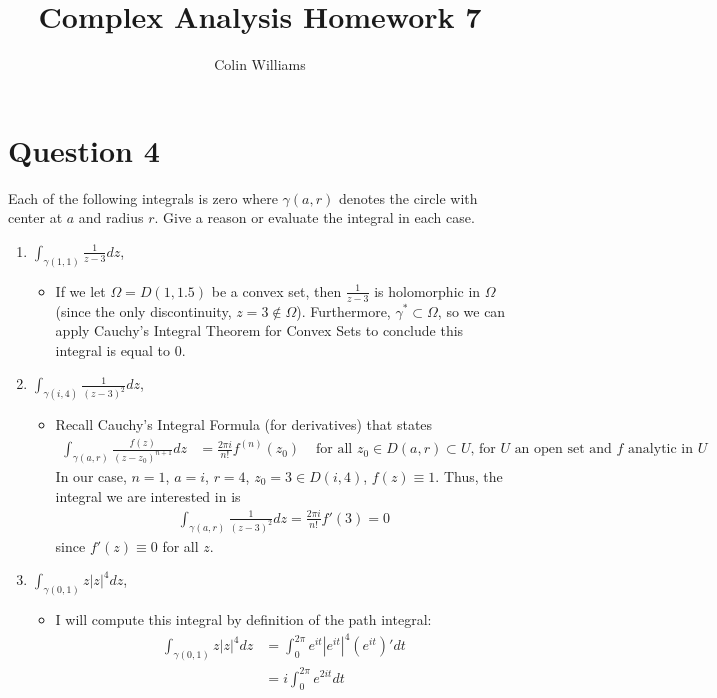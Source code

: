 \documentclass[10pt,a4paper]{article}
\title{Complex Analysis Homework 7}
\author{Colin Williams}
\theoremstyle{definition}
\begin{document}
\maketitle

\section*{Question 4}
Each of the following integrals is zero where $\gamma(a,r)$ denotes the circle with center at $a$ and radius $r$. Give a reason or evaluate the integral in each case. 
\begin{enumerate}[label = (\alph*)]
\item $\displaystyle \int_{\gamma(1,1)} \frac{1}{z - 3} dz$,
	\begin{itemize}
	\item If we let $\Omega = D(1,1.5)$ be a convex set, then $\frac{1}{z - 3}$ is holomorphic in $\Omega$ (since the only discontinuity, $z = 3 \not \in \Omega$). Furthermore, $\gamma^* \subset \Omega$, so we can apply Cauchy's Integral Theorem for Convex Sets to conclude this integral is equal to 0.
	\end{itemize}
\item $\displaystyle \int_{\gamma(i,4)} \frac{1}{(z - 3)^2} dz$,
	\begin{itemize}
	\item Recall Cauchy's Integral Formula (for derivatives) that states
	\begin{align*}
	\int_{\gamma(a,r)} \frac{f(z)}{(z - z_0)^{n + 1}}dz &= \frac{2\pi i}{n!}f^{(n)}(z_0) &\text{ for all $z_0 \in D(a,r) \subset U$, for $U$ an open set and $f$ analytic in $U$}
	\end{align*}
	In our case, $n = 1$, $a = i$, $r = 4$, $z_0 = 3 \in D(i,4)$, $f(z) \equiv 1$. Thus, the integral we are interested in is
	\begin{align*}
	\int_{\gamma(a,r)} \frac{1}{(z - 3)^2}dz = \frac{2\pi i}{n!} f'(3) = 0
	\end{align*}
	since $f'(z) \equiv 0$ for all $z$.
	\end{itemize}
\item $\displaystyle \int_{\gamma(0,1)} z|z|^4 dz$,
	\begin{itemize}
	\item I will compute this integral by definition of the path integral:
	\begin{align*}
	\int_{\gamma(0,1)} z|z|^4dz &= \int_{0}^{2\pi} e^{it}|e^{it}|^4 (e^{it})' dt\\
	&= i \int_{0}^{2\pi} e^{2it} dt\\

\end{align*}
\end{itemize}
\end{enumerate}
\end{document}
